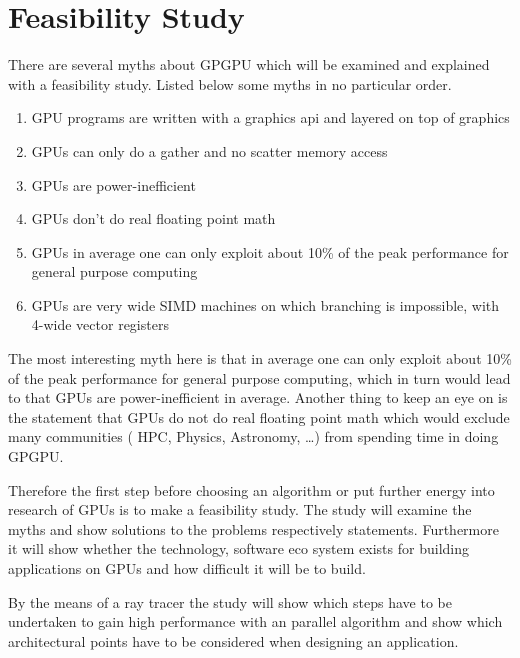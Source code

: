 \chapter{Feasibility Study}
\label{chap:feas}
There are several myths about \gls{GPGPU} which will be examined and explained 
with a feasibility study. Listed below some myths in no particular order.
\begin{enumerate}
	\item \Gls{GPU} programs are written with a graphics api and layered on top 
		of graphics
	\label{enum:api}
	\item \Glspl{GPU} can only do a gather and no scatter memory access
	\label{enum:gather}
	\item \Glspl{GPU} are power-inefficient
	\label{enum:ineff}
	\item \Glspl{GPU} don't do real floating point math
	\label{enum:float}
	\item \Glspl{GPU} in average one can only exploit about 10\% of the peak 
		performance for general purpose computing
	\label{enum:exploit}
	\item \Glspl{GPU} are very wide \gls{SIMD} machines on which branching is 	  
		impossible, with 4-wide vector registers
 	\label{enum:simd}
\end{enumerate}

The most interesting myth here is that in average one can only exploit about
10\% of the peak performance for general purpose computing, which in turn would 
lead to that \glspl{GPU} are power-inefficient in average. Another thing to 
keep an eye on is the statement that \glspl{GPU} do not do real floating point
math which would exclude many communities ( \gls{HPC}, Physics, Astronomy, \ldots)
 from spending time in doing \gls{GPGPU}. 

Therefore the first step before choosing an algorithm or put further energy into
research of \glspl{GPU} is to make a feasibility study. The study will examine
the myths and show solutions to the problems respectively statements.
Furthermore it will show whether the technology, software eco system exists for
building applications on \glspl{GPU} and how difficult it will be to build.

By the means of a ray tracer the study will show which steps have to be 
undertaken to gain high performance with an parallel algorithm and show which 
architectural points have to be considered when designing an application.


